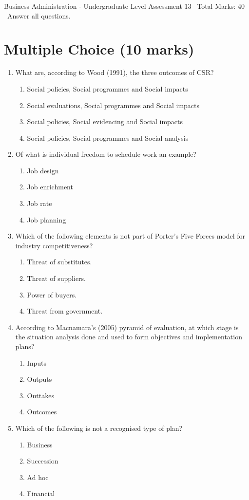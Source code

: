 \documentclass[12pt]{article}
\begin{document}
\begin{center}
Business Administration - Undergraduate Level Assessment 13 \
Total Marks: 40 \
Answer all questions.
\end{center}

\section*{Multiple Choice (10 marks)}
\begin{enumerate}[label=\arabic*.]
\item What are, according to Wood (1991), the three outcomes of CSR?
\begin{enumerate}[label=(\alph*)]
    \item Social policies, Social programmes and Social impacts
    \item Social evaluations, Social programmes and Social impacts
    \item Social policies, Social evidencing and Social impacts
    \item Social policies, Social programmes and Social analysis
\end{enumerate}
\item Of what is individual freedom to schedule work an example?
\begin{enumerate}[label=(\alph*)]
    \item Job design
    \item Job enrichment
    \item Job rate
    \item Job planning
\end{enumerate}
\item Which of the following elements is not part of Porter's Five Forces model for industry competitiveness?
\begin{enumerate}[label=(\alph*)]
    \item Threat of substitutes.
    \item Threat of suppliers.
    \item Power of buyers.
    \item Threat from government.
\end{enumerate}
\item According to Macnamara's (2005) pyramid of evaluation, at which stage is the situation analysis done and used to form objectives and implementation plans?
\begin{enumerate}[label=(\alph*)]
    \item Inputs
    \item Outputs
    \item Outtakes
    \item Outcomes
\end{enumerate}
\item Which of the following is not a recognised type of plan?
\begin{enumerate}[label=(\alph*)]
    \item Business
    \item Succession
    \item Ad hoc
    \item Financial
\end{enumerate}
\end{enumerate}
\end{document}
